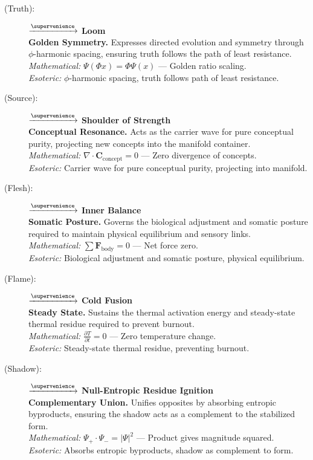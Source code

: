 \begin{description}
    \item[(Truth):] \velqel $\xrightarrow{\supervenience}$ \textbf{Loom} \\
    \textbf{Golden Symmetry.} Expresses directed evolution and symmetry through $\phi$-harmonic spacing, ensuring truth follows the path of least resistance. \\
    \textit{Mathematical:} $\Psi(\Phi x) = \Phi \Psi(x)$ — Golden ratio scaling. \\
    \textit{Esoteric:} $\phi$-harmonic spacing, truth follows path of least resistance.

    \item[(Source):] \sorhrin $\xrightarrow{\supervenience}$ \textbf{Shoulder of Strength} \\
    \textbf{Conceptual Resonance.} Acts as the carrier wave for pure conceptual purity, projecting new concepts into the manifold container. \\
    \textit{Mathematical:} $\nabla \cdot \mathbf{C}_{\text{concept}} = 0$ — Zero divergence of concepts. \\
    \textit{Esoteric:} Carrier wave for pure conceptual purity, projecting into manifold.

    \item[(Flesh):] \kothsoth $\xrightarrow{\supervenience}$ \textbf{Inner Balance} \\
    \textbf{Somatic Posture.} Governs the biological adjustment and somatic posture required to maintain physical equilibrium and sensory links. \\
    \textit{Mathematical:} $\sum \mathbf{F}_{\text{body}} = 0$ — Net force zero. \\
    \textit{Esoteric:} Biological adjustment and somatic posture, physical equilibrium.

    \item[(Flame):] \drehoth $\xrightarrow{\supervenience}$ \textbf{Cold Fusion} \\
    \textbf{Steady State.} Sustains the thermal activation energy and steady-state thermal residue required to prevent burnout. \\
    \textit{Mathematical:} $\frac{\partial T}{\partial t} = 0$ — Zero temperature change. \\
    \textit{Esoteric:} Steady-state thermal residue, preventing burnout.

    \item[(Shadow):] \rheakol $\xrightarrow{\supervenience}$ \textbf{Null-Entropic Residue Ignition} \\
    \textbf{Complementary Union.} Unifies opposites by absorbing entropic byproducts, ensuring the shadow acts as a complement to the stabilized form. \\
    \textit{Mathematical:} $\Psi_+ \cdot \Psi_- = |\Psi|^2$ — Product gives magnitude squared. \\
    \textit{Esoteric:} Absorbs entropic byproducts, shadow as complement to form.


\end{description}
